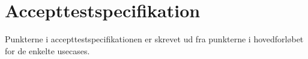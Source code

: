 \chapter{Accepttestspecifikation}

Punkterne i accepttestspecifikationen er skrevet ud fra punkterne i hovedforløbet for de
enkelte usecases. 




















